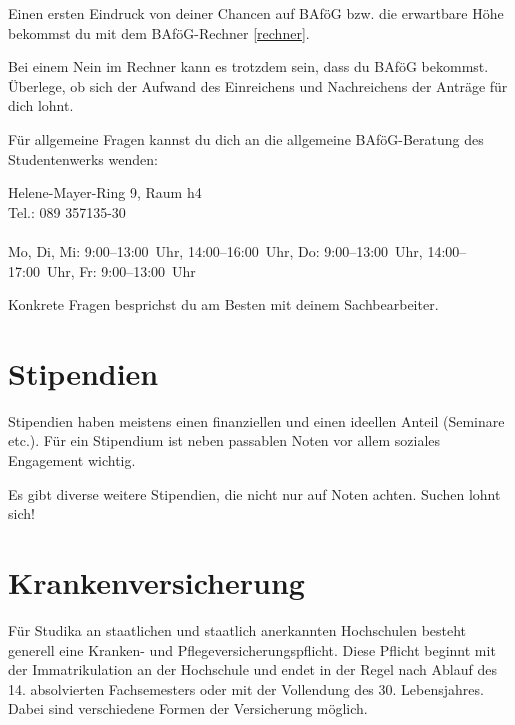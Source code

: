 Einen ersten Eindruck von deiner Chancen auf BAföG bzw. die erwartbare
Höhe bekommst du mit dem BAföG-Rechner \ref{rechner}.

Bei einem Nein im Rechner kann es trotzdem sein, dass du BAföG
bekommst. Überlege, ob sich der Aufwand des Einreichens und
Nachreichens der Anträge für dich lohnt.

Für allgemeine Fragen kannst du dich an die allgemeine BAföG-Beratung des Studentenwerks wenden:

Helene-Mayer-Ring 9, Raum h4\\
Tel.: 089 357135-30\\
\\
Mo, Di, Mi: 9:00--13:00~Uhr, 14:00--16:00~Uhr, Do: 9:00--13:00~Uhr, 14:00--17:00~Uhr, Fr: 9:00--13:00~Uhr

Konkrete Fragen besprichst du am Besten mit deinem Sachbearbeiter.

\begin{urlList}
\end{urlList}

\section{Stipendien}
Stipendien haben meistens einen finanziellen und einen ideellen Anteil
(Seminare etc.). Für ein Stipendium ist neben passablen Noten vor
allem soziales Engagement wichtig.

Es gibt diverse weitere Stipendien, die nicht nur auf Noten achten.
Suchen lohnt sich!

\begin{urlList}
\end{urlList}

\section{Krankenversicherung}

Für Studika an staatlichen und staatlich anerkannten Hochschulen
besteht generell eine Kranken- und Pflegeversicherungspflicht. Diese
Pflicht beginnt mit der Immatrikulation an der Hochschule und endet in
der Regel nach Ablauf des 14. absolvierten Fachsemesters oder mit der
Vollendung des 30. Lebensjahres. Dabei sind verschiedene Formen der
Versicherung möglich.

